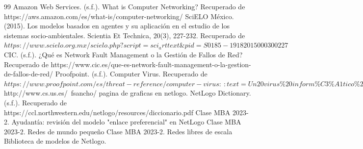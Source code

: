 \documentclass[12pt]{article}
\begin{document}
\begin{thebibliography}{99}
    Amazon Web Services. (s.f.). What is Computer Networking? Recuperado de https://aws.amazon.com/es/what-is/computer-networking/
    SciELO México. (2015). Los modelos basados en agentes y su aplicación en el estudio de los sistemas socio-ambientales. Scientia Et Technica, 20(3), 227-232. Recuperado de $https://www.scielo.org.mx/scielo.php?script=sci_arttext\&pid=S0185-19182015000300227$
    CIC. (s.f.). ¿Qué es Network Fault Management o la Gestión de Fallos de Red? Recuperado de https://www.cic.es/que-es-network-fault-management-o-la-gestion-de-fallos-de-red/
    Proofpoint. (s.f.). Computer Virus. Recuperado de $https://www.proofpoint.com/es/threat-reference/computer-virus:~:text=Un20virus\%20inform\%C3\%A1tico\%20es\%20una,un\%20dispositivo\%20o\%20red\%20local.$
    http://www.cs.us.es/~fsancho/ pagina de graficas en netlogo.
    NetLogo Dictionary. (s.f.). Recuperado de https://ccl.northwestern.edu/netlogo/resources/diccionario.pdf
    Clase MBA 2023-2. Ayudantía: revisión del modelo "enlace preferencial" en NetLogo
    Clase MBA 2023-2. Redes de mundo pequeño
    Clase MBA 2023-2. Redes libres de escala
     Biblioteca de modelos de Netlogo.
\end{thebibliography}
\end{document}
